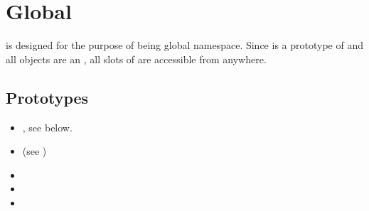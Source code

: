 
\section{Global}

 is designed for the purpose of being global
namespace. Since  is a prototype of  and all
objects are an , all slots of  are accessible from
anywhere.

\subsection{Prototypes}
\begin{itemize}
\item {}, see below.
\item {} (see )
\item {}
\item {}
\item {}
\end{itemize}

